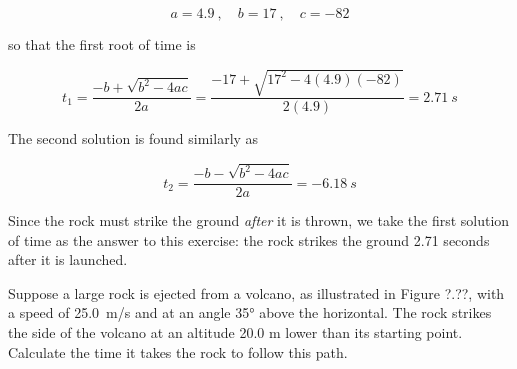 \documentclass[main.tex]{subfiles}
\begin{document}
\begin{equation*}
    a = 4.9\ , \quad b = 17\ ,\quad c = -82
\end{equation*}

so that the first root of time is

\begin{equation*}
    t_1 = \frac{-b + \sqrt{b^2 - 4ac}}{2a} = \frac{-17 + \sqrt{17^2 - 4(4.9)(-82)}}{2(4.9)} = \SI{2.71}{s}
\end{equation*}

The second solution is found similarly as

\begin{equation*}
    t_2 = \frac{-b - \sqrt{b^2 - 4ac}}{2a} = \SI{-6.18}{s}
\end{equation*}

Since the rock must strike the ground \textit{after} it is thrown, we take the first solution of time as the answer to this exercise: the rock strikes the ground 2.71 seconds after it is launched. 

\solutionEnd

\begin{example}
    Suppose a large rock is ejected from a volcano, as illustrated in Figure ?.??, with a speed of  \SI{25.0}{m/s} and at an angle \ang{35} above the horizontal. The rock strikes the side of the volcano at an altitude 20.0 m lower than its starting point. Calculate the time it takes the rock to follow this path.
\end{example}
\end{document}
